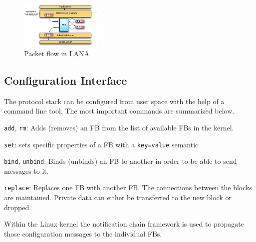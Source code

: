 \documentclass{sig-alternate}
\begin{document}

\begin{figure}
\centering
\includegraphics[width=0.35\textwidth]{figures/data_flow.pdf}
\vspace{-0.2cm}
\caption{Packet flow in LANA}
\label{fig:architecture}
\vspace{-0.5cm}
\end{figure}

\subsection{Configuration Interface}
The protocol stack can be configured from user space with the help of a 
command line tool. The most important commands are summarized below.
\begin{compactitem}
\item \texttt{add}, \texttt{rm}: Adds (removes) an FB from the 
      list of available FBs in the kernel. 
\item \texttt{set}: sets specific properties of a FB with a 
      \texttt{key=value} semantic
\item \texttt{bind}, \texttt{unbind}: Binds (unbinds) an FB 
      to another in order to be able to send messages to it. 
\item \texttt{replace}: Replaces one FB with another 
      FB. The connections between the blocks are maintained. 
      Private data can either be transferred to the new block or dropped.
\end{compactitem}
Within the Linux kernel the notification chain framework is used to propagate those configuration messages to the individual FBs. 
\end{document}
